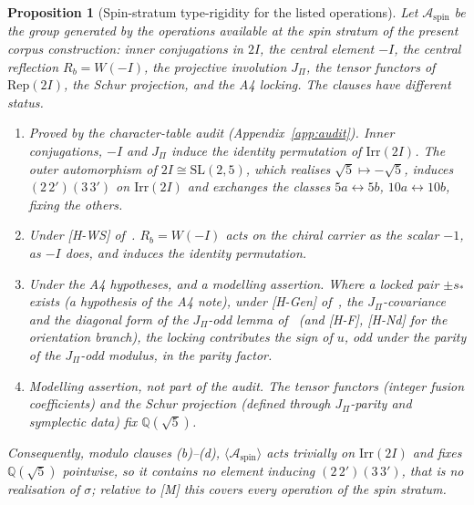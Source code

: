 \documentclass[11pt]{article}
\newtheorem{proposition}{Proposition}
\theoremstyle{definition}
\theoremstyle{remark}
\begin{document}
    \begin{proposition}[Spin-stratum type-rigidity for the listed operations]
      \label{prop:spinrigidity}
      Let $\mathcal{A}_{\mathrm{spin}}$ be the group generated by the operations available at the spin stratum of the
      present corpus construction: inner conjugations in $2I$, the central element $-I$, the central reflection
      $R_b=W(-I)$, the projective involution $J_\Pi$, the tensor functors of $\mathrm{Rep}(2I)$, the Schur projection,
      and the A4 locking.
      The clauses have different status.
      \begin{enumerate}
        \item[(a)] \emph{Proved by the character-table audit} (Appendix~\ref{app:audit}).
        Inner conjugations, $-I$ and $J_\Pi$ induce the identity permutation of $\mathrm{Irr}(2I)$.
        The outer automorphism of $2I\cong\mathrm{SL}(2,5)$, which realises $\sqrt{5}\mapsto-\sqrt{5}$, induces
        $(2\,2')(3\,3')$ on $\mathrm{Irr}(2I)$ and exchanges the classes $5a\leftrightarrow5b$, $10a\leftrightarrow10b$,
        fixing the others.
        \item[(b)] \emph{Under [H-WS] of~\cite{Beau2026q11of}.} $R_b=W(-I)$ acts on the chiral carrier as the scalar $-1$,
        as $-I$ does, and induces the identity permutation.
        \item[(c)] \emph{Under the A4 hypotheses, and a modelling assertion.} Where a locked pair $\pm s_*$ exists (a hypothesis of the A4 note), under
        [H-Gen] of~\cite{Beau2026prs}, the $J_\Pi$-covariance and the diagonal form of the $J_\Pi$-odd lemma
        of~\cite{Beau2026a4} (and [H-F], [H-Nd] for the orientation branch), the locking contributes the sign of $u$,
        odd under the parity of the $J_\Pi$-odd modulus, in the parity factor.
        \item[(d)] \emph{Modelling assertion, not part of the audit.} The tensor functors (integer fusion coefficients)
        and the Schur projection (defined through $J_\Pi$-parity and symplectic data) fix $\mathbb{Q}(\sqrt{5})$.
      \end{enumerate}
      Consequently, modulo clauses (b)--(d), $\langle\mathcal{A}_{\mathrm{spin}}\rangle$ acts trivially on
      $\mathrm{Irr}(2I)$ and fixes $\mathbb{Q}(\sqrt{5})$ pointwise, so it contains no element inducing
      $(2\,2')(3\,3')$, that is no realisation of $\sigma$; relative to [M] this covers every operation of the spin
      stratum.
    \end{proposition}
\end{document}

